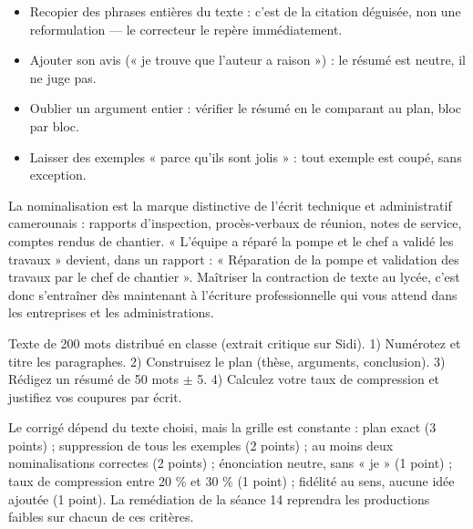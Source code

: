 \documentclass[11pt]{article}
\begin{document}
\begin{attention}
\begin{itemize}
\item Recopier des phrases entières du texte : c'est de la citation déguisée, non une reformulation — le correcteur le repère immédiatement.
\item Ajouter son avis (« je trouve que l'auteur a raison ») : le résumé est neutre, il ne juge pas.
\item Oublier un argument entier : vérifier le résumé en le comparant au plan, bloc par bloc.
\item Laisser des exemples « parce qu'ils sont jolis » : tout exemple est coupé, sans exception.
\end{itemize}
\end{attention}

\begin{savaistu}
La nominalisation est la marque distinctive de l'écrit technique et administratif camerounais : rapports d'inspection, procès-verbaux de réunion, notes de service, comptes rendus de chantier. « L'équipe a réparé la pompe et le chef a validé les travaux » devient, dans un rapport : « Réparation de la pompe et validation des travaux par le chef de chantier ». Maîtriser la contraction de texte au lycée, c'est donc s'entraîner dès maintenant à l'écriture professionnelle qui vous attend dans les entreprises et les administrations.
\end{savaistu}

\begin{exercice}
Texte de 200 mots distribué en classe (extrait critique sur Sidi). 1) Numérotez et titre les paragraphes. 2) Construisez le plan (thèse, arguments, conclusion). 3) Rédigez un résumé de 50 mots $\pm$ 5. 4) Calculez votre taux de compression et justifiez vos coupures par écrit.
\end{exercice}

\begin{corrige}
Le corrigé dépend du texte choisi, mais la grille est constante : plan exact (3 points) ; suppression de tous les exemples (2 points) ; au moins deux nominalisations correctes (2 points) ; énonciation neutre, sans « je » (1 point) ; taux de compression entre 20 \% et 30 \% (1 point) ; fidélité au sens, aucune idée ajoutée (1 point). La remédiation de la séance 14 reprendra les productions faibles sur chacun de ces critères.
\end{corrige}
\end{document}
